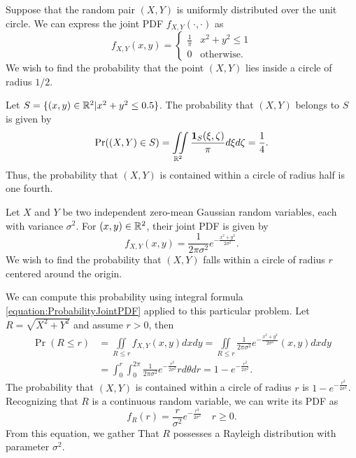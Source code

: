 \begin{example}
Suppose that the random pair $(X, Y)$ is uniformly distributed over the unit circle.
We can express the joint PDF $f_{X,Y} (\cdot, \cdot)$ as
\begin{equation*}
f_{X,Y} (x, y) = \begin{cases} \frac{1}{\pi} & x^2 + y^2 \leq 1 \\
0 & \text{otherwise} . \end{cases}
\end{equation*}
We wish to find the probability that the point $(X, Y)$ lies inside a circle of radius $1/2$.

Let $S = \{ (x, y) \in \mathbb{R}^2 | x^2 + y^2 \leq 0.5 \}$.
The probability that $(X, Y)$ belongs to $S$ is given by
\begin{equation*}
\Pr ((X,Y) \in S)
= \iint\limits_{\mathbb{R}^2}
\frac{ \mathbf{1}_{S}(\xi, \zeta) }{\pi} d\xi d\zeta
= \frac{1}{4} .
\end{equation*}
Thus, the probability that $(X,Y)$ is contained within a circle of radius half is one fourth.
\end{example}

\begin{example}
Let $X$ and $Y$ be two independent zero-mean Gaussian random variables, each with variance $\sigma^2$.
For $(x, y) \in \mathbb{R}^2$, their joint PDF is given by
\begin{equation*}
f_{X,Y} (x,y) = \frac{1}{2 \pi \sigma^2} e^{- \frac{ x^2 + y^2 }{2 \sigma^2} } .
\end{equation*}
We wish to find the probability that $(X,Y)$ falls within a circle of radius $r$ centered around the origin.

We can compute this probability using integral formula \eqref{equation:ProbabilityJointPDF} applied to this particular problem.
Let $R = \sqrt{X^2 + Y^2}$ and assume $r > 0$, then
\begin{equation*}
\begin{split}
\Pr (R \leq r) &= \iint\limits_{R \leq r} f_{X,Y} (x,y) dx dy
= \iint\limits_{R \leq r} \frac{1}{2 \pi \sigma^2}
e^{- \frac{ x^2 + y^2 }{2 \sigma^2} } (x,y) dx dy \\
&= \int_0^r \int_0^{2\pi} \frac{1}{2 \pi \sigma^2}
e^{- \frac{ r^2 }{2 \sigma^2} } r d\theta dr
= 1 - e^{- \frac{ r^2 }{2 \sigma^2} } .
\end{split}
\end{equation*}
The probability that $(X, Y)$ is contained within a circle of radius $r$ is $1 - e^{- \frac{ r^2 }{2 \sigma^2} }$.
Recognizing that $R$ is a continuous random variable, we can write its PDF as
\begin{equation*}
f_R (r) = \frac{r}{\sigma^2} e^{- \frac{r^2}{2 \sigma^2} } \quad r \geq 0 .
\end{equation*}
From this equation, we gather That $R$ possesses a Rayleigh distribution with parameter $\sigma^2$.
\end{example}


